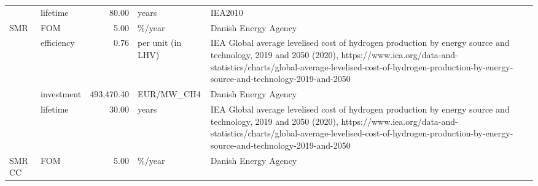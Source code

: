 \begin{longtable}{p{5cm}p{3cm}rp{3cm}p{11cm}}
                      & lifetime &          80.00 &                             years &                                                                                                                                                                                                                                                                                                                              IEA2010 \\
SMR & FOM &           5.00 &                            \%/year &                                                                                                                                                                                                                                                                                                                 Danish Energy Agency \\
                      & efficiency &           0.76 &                 per unit (in LHV) &                                                                    IEA Global average levelised cost of hydrogen production by energy source and technology, 2019 and 2050 (2020), https://www.iea.org/data-and-statistics/charts/global-average-levelised-cost-of-hydrogen-production-by-energy-source-and-technology-2019-and-2050 \\
                      & investment &     493,470.40 &                        EUR/MW\_CH4 &                                                                                                                                                                                                                                                                                                                 Danish Energy Agency \\
                      & lifetime &          30.00 &                             years &                                                                    IEA Global average levelised cost of hydrogen production by energy source and technology, 2019 and 2050 (2020), https://www.iea.org/data-and-statistics/charts/global-average-levelised-cost-of-hydrogen-production-by-energy-source-and-technology-2019-and-2050 \\
SMR CC & FOM &           5.00 &                            \%/year &                                                                                                                                                                                                                                                                                                                 Danish Energy Agency \\

\end{longtable}
